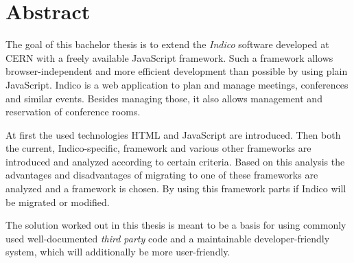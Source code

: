 \chapter*{Abstract}
\thispagestyle{empty}

The goal of this bachelor thesis is to extend the \emph{Indico} software developed at CERN with a
freely available JavaScript framework. Such a framework allows browser-independent and more
efficient development than possible by using plain JavaScript. Indico is a web application to plan
and manage meetings, conferences and similar events. Besides managing those, it also allows
management and reservation of conference rooms.

At first the used technologies HTML and JavaScript are introduced. Then both the current,
Indico-specific, framework and various other frameworks are introduced and analyzed according to
certain criteria. Based on this analysis the advantages and disadvantages of migrating to one of
these frameworks are analyzed and a framework is chosen. By using this framework parts if Indico
will be migrated or modified.

The solution worked out in this thesis is meant to be a basis for using commonly used
well-documented \emph{third party} code and a maintainable developer-friendly system, which will
additionally be more user-friendly.

